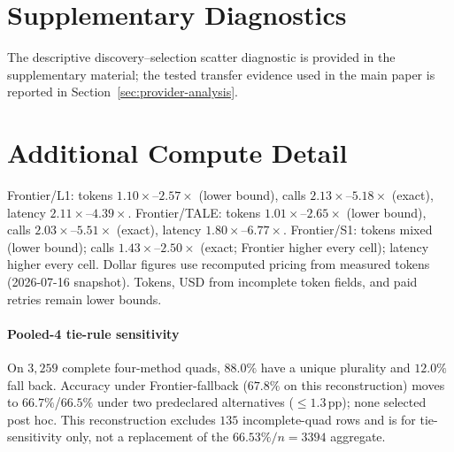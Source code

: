 \section{Supplementary Diagnostics}
\label{app:supp-diagnostics}

The descriptive discovery--selection scatter diagnostic is provided in the supplementary material;
the tested transfer evidence used in the main paper is reported in Section~\ref{sec:provider-analysis}.

\section{Additional Compute Detail}
\label{app:compute-detail}

Frontier/L1: tokens $1.10\times$--$2.57\times$ (lower bound), calls $2.13\times$--$5.18\times$
(exact), latency $2.11\times$--$4.39\times$. Frontier/TALE: tokens $1.01\times$--$2.65\times$
(lower bound), calls $2.03\times$--$5.51\times$ (exact), latency $1.80\times$--$6.77\times$.
Frontier/S1: tokens mixed (lower bound); calls $1.43\times$--$2.50\times$ (exact; Frontier higher
every cell); latency higher every cell. Dollar figures use recomputed pricing from measured tokens
(2026-07-16 snapshot). Tokens, USD from incomplete token fields, and paid retries remain lower
bounds.

\paragraph{Pooled-4 tie-rule sensitivity} On $3{,}259$ complete four-method quads, $88.0\%$ have a
unique plurality and $12.0\%$ fall back. Accuracy under Frontier-fallback ($67.8\%$ on this
reconstruction) moves to $66.7\%$/$66.5\%$ under two predeclared alternatives ($\leq 1.3$\,pp);
none selected post hoc. This reconstruction excludes $135$ incomplete-quad rows and is for
tie-sensitivity only, not a replacement of the $66.53\%/n{=}3394$ aggregate.
